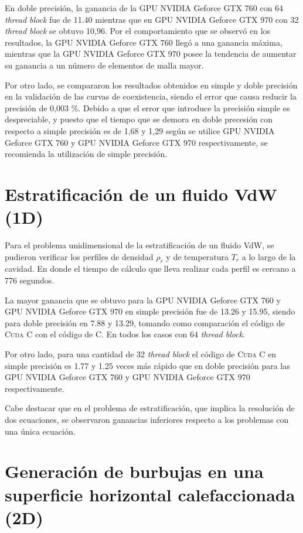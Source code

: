 En doble precisión, la ganancia de la GPU NVIDIA Geforce GTX 760 con 64 \textit{thread block} fue de 11.40 mientras que en GPU NVIDIA Geforce GTX 970 con 32 \textit{thread block} se obtuvo 10,96. Por el comportamiento que se observó en los resultados, la GPU NVIDIA Geforce GTX 760 llegó a una ganancia máxima, mientras que la GPU NVIDIA Geforce GTX 970 posee la tendencia de aumentar su ganancia a un número de elementos de malla mayor.

\newpage

Por otro lado, se compararon los resultados obtenidos en simple y doble precisión en la validación de las curvas de coexistencia, siendo el error que causa reducir la precisión de 0,003 \%.  Debido a que el error que introduce la precisión simple es despreciable, y puesto que el tiempo que se demora en doble precesión con respecto a simple precisión es de 1,68 y 1,29 según se utilice GPU NVIDIA Geforce GTX 760 y GPU NVIDIA Geforce GTX 970 respectivamente, se recomienda la utilización de simple precisión.

\section{Estratificación de un fluido VdW (1D)}

Para el problema unidimensional de la estratificación de un fluido VdW, se pudieron verificar los perfiles de densidad $\rho_r$ y de temperatura $T_r$ a lo largo de la cavidad. En donde el tiempo de cálculo que lleva realizar cada perfil es cercano a 776 segundos.

La mayor ganancia que se obtuvo para la GPU NVIDIA Geforce GTX 760 y GPU NVIDIA Geforce GTX 970 en simple precisión fue de 13.26 y 15.95, siendo para doble precisión en 7.88 y 13.29, tomando como comparación el código de \textsc{Cuda C} con el código de \textsc{C}. En todos los casos con 64 \textit{thread block}.

Por otro lado, para una cantidad de 32 \textit{thread block} el código de \textsc{Cuda C}  en simple precisión es 1.77 y 1.25 veces más rápido que en doble precisión para  las GPU NVIDIA Geforce GTX 760 y GPU NVIDIA Geforce GTX 970 respectivamente. 

Cabe destacar que en el problema de estratificación, que implica la resolución de dos ecuaciones, se observaron ganancias inferiores respecto a los problemas con una única ecuación.

\section{Generación de burbujas en una superficie horizontal calefaccionada (2D)}

